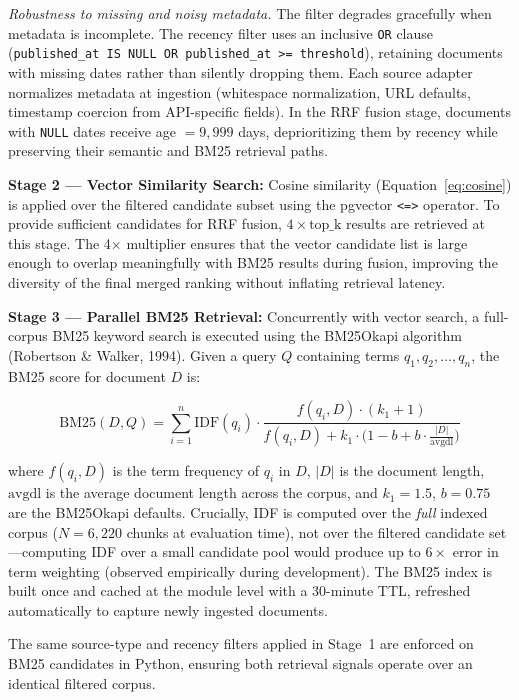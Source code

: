 \textit{Robustness to missing and noisy metadata.} The filter degrades gracefully when metadata is incomplete. The recency filter uses an inclusive \texttt{OR} clause (\texttt{published\_at IS NULL OR published\_at >= threshold}), retaining documents with missing dates rather than silently dropping them. Each source adapter normalizes metadata at ingestion (whitespace normalization, URL defaults, timestamp coercion from API-specific fields). In the RRF fusion stage, documents with \texttt{NULL} dates receive age $= 9{,}999$ days, deprioritizing them by recency while preserving their semantic and BM25 retrieval paths.

\textbf{Stage 2 --- Vector Similarity Search:} Cosine similarity (Equation~\ref{eq:cosine}) is applied over the filtered candidate subset using the pgvector \texttt{<=>} operator. To provide sufficient candidates for RRF fusion, $4 \times \text{top\_k}$ results are retrieved at this stage. The 4$\times$ multiplier ensures that the vector candidate list is large enough to overlap meaningfully with BM25 results during fusion, improving the diversity of the final merged ranking without inflating retrieval latency.

\textbf{Stage 3 --- Parallel BM25 Retrieval:} Concurrently with vector search, a full-corpus BM25 keyword search is executed using the BM25Okapi algorithm (Robertson \& Walker, 1994). Given a query $Q$ containing terms $q_1, q_2, \ldots, q_n$, the BM25 score for document $D$ is:

\begin{equation}
  \text{BM25}(D, Q) = \sum_{i=1}^{n} \text{IDF}(q_i) \cdot \frac{f(q_i, D) \cdot (k_1 + 1)}{f(q_i, D) + k_1 \cdot \bigl(1 - b + b \cdot \frac{|D|}{\text{avgdl}}\bigr)}
  \label{eq:bm25}
\end{equation}

\noindent where $f(q_i, D)$ is the term frequency of $q_i$ in $D$, $|D|$ is the document length, $\text{avgdl}$ is the average document length across the corpus, and $k_1 = 1.5$, $b = 0.75$ are the BM25Okapi defaults. Crucially, IDF is computed over the \emph{full} indexed corpus ($N = 6{,}220$ chunks at evaluation time), not over the filtered candidate set---computing IDF over a small candidate pool would produce up to $6\times$ error in term weighting (observed empirically during development). The BM25 index is built once and cached at the module level with a 30-minute TTL, refreshed automatically to capture newly ingested documents.

The same source-type and recency filters applied in Stage~1 are enforced on BM25 candidates in Python, ensuring both retrieval signals operate over an identical filtered corpus.

